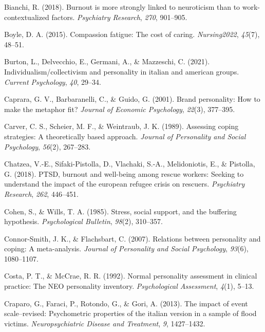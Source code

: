 \documentclass[
  man,floatsintext]{apa7}
\newlength{\cslhangindent}
\newlength{\cslentryspacingunit} %
\newenvironment{CSLReferences}[2] %
 {%
  \setlength{\parindent}{0pt}
  \ifodd #1
  \let\oldpar\par
  \def\par{\hangindent=\cslhangindent\oldpar}
  \fi
  \setlength{\parskip}{#2\cslentryspacingunit}
 }%
 {}
\begin{document}
\begin{CSLReferences}{1}{0}
\leavevmode{}%
Bianchi, R. (2018). Burnout is more strongly linked to neuroticism than to work-contextualized factors. \emph{Psychiatry Research}, \emph{270}, 901--905.

\leavevmode{}%
Boyle, D. A. (2015). Compassion fatigue: The cost of caring. \emph{Nursing2022}, \emph{45}(7), 48--51.

\leavevmode{}%
Burton, L., Delvecchio, E., Germani, A., \& Mazzeschi, C. (2021). Individualism/collectivism and personality in italian and american groups. \emph{Current Psychology}, \emph{40}, 29--34.

\leavevmode{}%
Caprara, G. V., Barbaranelli, C., \& Guido, G. (2001). Brand personality: How to make the metaphor fit? \emph{Journal of Economic Psychology}, \emph{22}(3), 377--395.

\leavevmode{}%
Carver, C. S., Scheier, M. F., \& Weintraub, J. K. (1989). Assessing coping strategies: A theoretically based approach. \emph{Journal of Personality and Social Psychology}, \emph{56}(2), 267--283.

\leavevmode{}%
Chatzea, V.-E., Sifaki-Pistolla, D., Vlachaki, S.-A., Melidoniotis, E., \& Pistolla, G. (2018). PTSD, burnout and well-being among rescue workers: Seeking to understand the impact of the european refugee crisis on rescuers. \emph{Psychiatry Research}, \emph{262}, 446--451.

\leavevmode{}%
Cohen, S., \& Wills, T. A. (1985). Stress, social support, and the buffering hypothesis. \emph{Psychological Bulletin}, \emph{98}(2), 310--357.

\leavevmode{}%
Connor-Smith, J. K., \& Flachsbart, C. (2007). Relations between personality and coping: A meta-analysis. \emph{Journal of Personality and Social Psychology}, \emph{93}(6), 1080--1107.

\leavevmode{}%
Costa, P. T., \& McCrae, R. R. (1992). Normal personality assessment in clinical practice: The NEO personality inventory. \emph{Psychological Assessment}, \emph{4}(1), 5--13.

\leavevmode{}%
Craparo, G., Faraci, P., Rotondo, G., \& Gori, A. (2013). The impact of event scale--revised: Psychometric properties of the italian version in a sample of flood victims. \emph{Neuropsychiatric Disease and Treatment}, \emph{9}, 1427--1432.


\end{CSLReferences}
\end{document}

